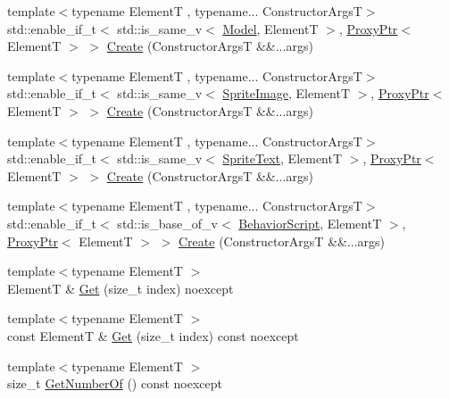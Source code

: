\begin{DoxyCompactItemize}
\item 
{\footnotesize template$<$typename ElementT , typename... Constructor\+ArgsT$>$ }\\std\+::enable\+\_\+if\+\_\+t$<$ std\+::is\+\_\+same\+\_\+v$<$ \hyperlink{classmage_1_1_model}{Model}, ElementT $>$, \hyperlink{classmage_1_1_proxy_ptr}{Proxy\+Ptr}$<$ ElementT $>$ $>$ \hyperlink{classmage_1_1_scene_a6300df61b18b1a64cb89db11924fec46}{Create} (Constructor\+ArgsT \&\&...args)
\item 
{\footnotesize template$<$typename ElementT , typename... Constructor\+ArgsT$>$ }\\std\+::enable\+\_\+if\+\_\+t$<$ std\+::is\+\_\+same\+\_\+v$<$ \hyperlink{classmage_1_1_sprite_image}{Sprite\+Image}, ElementT $>$, \hyperlink{classmage_1_1_proxy_ptr}{Proxy\+Ptr}$<$ ElementT $>$ $>$ \hyperlink{classmage_1_1_scene_ae91da18ed230dddb5ed8f421773bb874}{Create} (Constructor\+ArgsT \&\&...args)
\item 
{\footnotesize template$<$typename ElementT , typename... Constructor\+ArgsT$>$ }\\std\+::enable\+\_\+if\+\_\+t$<$ std\+::is\+\_\+same\+\_\+v$<$ \hyperlink{classmage_1_1_sprite_text}{Sprite\+Text}, ElementT $>$, \hyperlink{classmage_1_1_proxy_ptr}{Proxy\+Ptr}$<$ ElementT $>$ $>$ \hyperlink{classmage_1_1_scene_a3232b0b2c5105a03326d7d05b5c6198b}{Create} (Constructor\+ArgsT \&\&...args)
\item 
{\footnotesize template$<$typename ElementT , typename... Constructor\+ArgsT$>$ }\\std\+::enable\+\_\+if\+\_\+t$<$ std\+::is\+\_\+base\+\_\+of\+\_\+v$<$ \hyperlink{classmage_1_1_behavior_script}{Behavior\+Script}, ElementT $>$, \hyperlink{classmage_1_1_proxy_ptr}{Proxy\+Ptr}$<$ ElementT $>$ $>$ \hyperlink{classmage_1_1_scene_aab7992ccdf1e98213ed3cb96b6d376e2}{Create} (Constructor\+ArgsT \&\&...args)
\item 
{\footnotesize template$<$typename ElementT $>$ }\\ElementT \& \hyperlink{classmage_1_1_scene_a51322766fa1e347d71fb8feb09675bf4}{Get} (size\+\_\+t index) noexcept
\item 
{\footnotesize template$<$typename ElementT $>$ }\\const ElementT \& \hyperlink{classmage_1_1_scene_a80da83574645fabca847697a7ca38fa7}{Get} (size\+\_\+t index) const noexcept
\item 
{\footnotesize template$<$typename ElementT $>$ }\\size\+\_\+t \hyperlink{classmage_1_1_scene_a308480749d009dad3a39333fd0c59f2a}{Get\+Number\+Of} () const noexcept

\end{DoxyCompactItemize}
